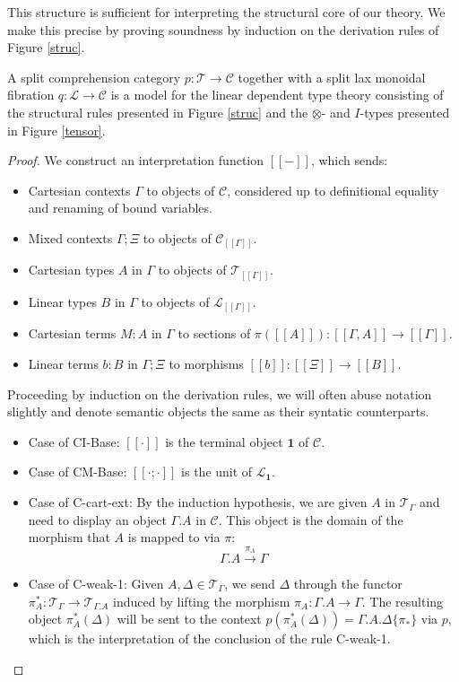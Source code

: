 This structure is sufficient for interpreting the structural core of our theory. We make this precise by proving soundness by induction on the derivation rules of Figure \ref{struc}.
\begin{thm}[Soundness]
A split comprehension category $p : \mathcal{T} \to \mathcal{C}$ together with a split lax monoidal fibration $q : \mathcal{L} \to \mathcal{C}$ is a model for the linear dependent type theory consisting of the structural rules presented in Figure \ref{struc} and the $\otimes$- and $I$-types presented in Figure \ref{tensor}.
\begin{proof}
  We construct an interpretation function $[[-]]$, which sends:
  \begin{itemize}
  \item Cartesian contexts $\Gamma$ to objects of $\mathcal{C}$, considered up to definitional equality and renaming of bound variables.
  \item Mixed contexts $\Gamma; \Xi$ to objects of $\mathcal{C}_{[[\Gamma]]}$.
  \item Cartesian types $A$ in $\Gamma$ to objects of $\mathcal{T}_{[[\Gamma]]}$.
  \item Linear types $B$ in $\Gamma$ to objects of $\mathcal{L}_{[[\Gamma]]}$.
  \item Cartesian terms $M : A$ in $\Gamma$ to sections of $\pi([[A]]) : [[\Gamma,A]] \to [[\Gamma]]$.
  \item Linear terms $b : B$ in $\Gamma; \Xi$ to morphisms $[[b]] : [[\Xi]] \to [[B]]$.
  \end{itemize}
Proceeding by induction on the derivation rules, we will often abuse notation slightly and denote semantic objects the same as their syntatic counterparts.
\begin{itemize}
\item Case of CI-Base: $[[\cdot]]$ is the terminal object $\mathbf{1}$ of $\mathcal{C}$.
\item Case of CM-Base: $[[\cdot; \cdot]]$ is the unit of $\mathcal{L}_{\mathbf{1}}$.
\item Case of C-cart-ext: By the induction hypothesis, we are given $A$ in $\mathcal{T}_{\Gamma}$ and need to display an object $\Gamma.A$ in $\mathcal{C}$. This object is the domain of the morphism that $A$ is mapped to via $\pi$:
\[\Gamma.A \xrightarrow {\pi_A} \Gamma\]
\item Case of C-weak-1: Given $A, \Delta \in \mathcal{T}_{\Gamma}$, we send $\Delta$ through the functor $\pi_A^* : \mathcal{T}_\Gamma \to \mathcal{T}_{\Gamma.A}$ induced by lifting the morphism $\pi_A : \Gamma.A \to \Gamma$. The resulting object $\pi_A^*(\Delta)$ will be sent to the context $p(\pi_A^*(\Delta)) = \Gamma.A.\Delta\{\pi_*\}$ via $p$, which is the interpretation of the conclusion of the rule C-weak-1.

\end{itemize}
\end{proof}
\end{thm}
